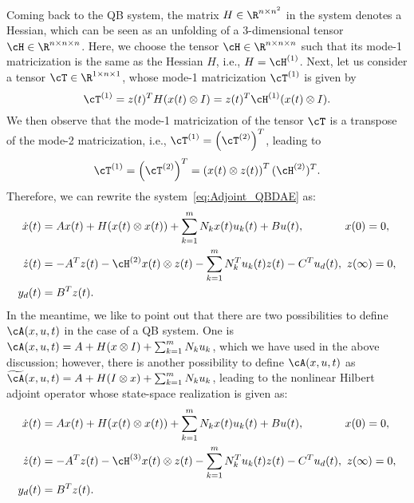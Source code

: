 Coming back to the QB system, the matrix $H\in \R^{n\times n^2}$ in the system denotes a Hessian, which can be seen as an unfolding of a 3-dimensional tensor $\cH\in \R^{n\times n\times n}$.   Here, we choose the tensor $\cH\in \R^{n\times n\times n}$ such that its mode-1 matricization is the same as the Hessian $H$, i.e., $H = \cH^{(1)}$. Next, let us consider a tensor $\cT\in \R^{1\times n\times 1}$, whose mode-1 matricization $\cT^{(1)}$ is given by
\begin{equation*}
 \cT^{(1)}  = z(t)^T H (x{(t)\otimes I}) = z(t)^T \cH^{(1)} (x{(t)\otimes I}).
\end{equation*}
We then observe that the mode-1 matricization of the tensor $\cT$ is a transpose of the mode-2 matricization, i.e., $\cT^{(1)} = \left(\cT^{(2)}\right)^T$, leading to
\begin{equation*}
 \cT^{(1)} = \left(\cT^{(2)}\right)^T = \left(x(t)\otimes z(t)\right)^T (\cH^{(2)})^T.
\end{equation*}
Therefore, we can rewrite the system~\eqref{eq:Adjoint_QBDAE} as:
\begin{subequations}\label{eq:Adjoint_QBDAE1}
 \begin{align}
  \dot{x}(t) &= Ax(t) + H(x(t) \otimes x(t))  +  \sum_{k=1}^mN_kx(t)u_k(t) + Bu(t), \qquad~~~~~ x(0) = 0,\label{eq:state1}\\
  \dot{z}(t) &= -A^Tz(t) - \cH^{(2)} x(t)\otimes z(t) - \sum_{k=1}^m N_k^T u_k(t) z(t) - C^Tu_d(t),~ z(\infty) = 0,\\
  y_d(t) &= B^Tz(t).
 \end{align}
\end{subequations}
In the meantime, we like to point out that there are two possibilities to define $\cA(x,u,t)$ in the case of a QB system. One is  $\cA(x,u,t) = A + H(x\otimes I) + \sum_{k=1}^mN_ku_k$, which we have used in the above discussion; however, there is  another possibility to define  $\cA(x,u,t)$  as  $\tilde{\cA}(x,u,t)= A + H(I\otimes x) + \sum_{k=1}^mN_ku_k$, leading to the nonlinear Hilbert adjoint operator whose  state-space realization is given as:
\begin{subequations}\label{eq:Adjoint_QBDAE2}
	\begin{align}
	\dot{x}(t) &= Ax(t) + H(x(t) \otimes x(t))  +  \sum_{k=1}^mN_kx(t)u_k(t) + Bu(t), \qquad~~~~~ x(0) = 0,\label{eq:state1}\\
	\dot{z}(t) &= -A^Tz(t) - \cH^{(3)} x(t)\otimes z(t) - \sum_{k=1}^m N_k^T u_k(t) z(t) - C^Tu_d(t),~ z(\infty) = 0,\\
	y_d(t) &= B^Tz(t).
	\end{align}
\end{subequations}
